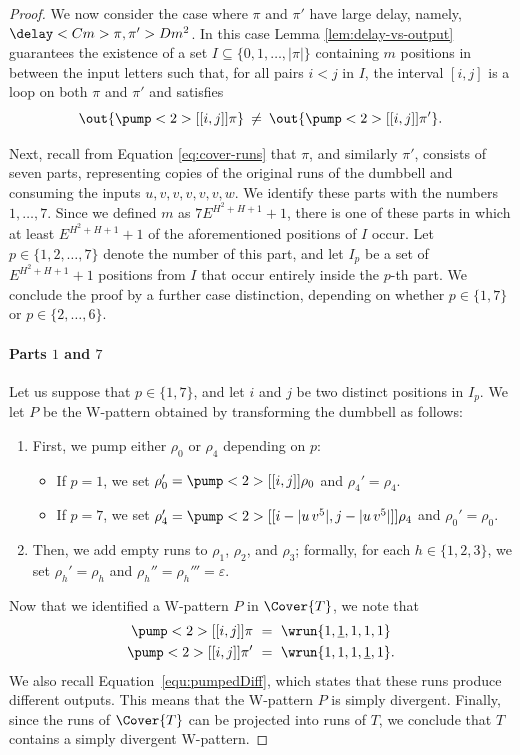 \documentclass{article}
\begin{document}
\begin{proof}
We now consider the case where $\pi$ and $\pi'$
have large delay, namely,
$\delay<C m>{\pi,\pi'} > D m^2$.
In this case Lemma \ref{lem:delay-vs-output} guarantees 
the existence of a set
$I \subseteq \{0, 1, \ldots, |\pi|\}$ containing 
$m$ positions in between the input letters such that,
for all pairs $i < j$ in $I$, the interval $[i,j]$
is a loop on both $\pi$ and $\pi'$ and satisfies
\begin{equation}\label{equ:pumpedDiff}
  \out{\pump<2>[[i,j]]{\pi}} 
  \:\neq\: 
  \out{\pump<2>[[i,j]]{\pi'}}.
\end{equation}

Next, recall from Equation \eqref{eq:cover-runs}
that $\pi$, and similarly $\pi'$, consists of seven parts,
representing copies of the original runs of the dumbbell
and consuming the inputs $u, v, v, v, v, v, w$.
We identify these parts with the numbers $1,\dots,7$.
Since we defined $m$ as $7E^{H^2 + H + 1}+1$,
there is one of these parts
in which at least $E^{H^2 + H + 1}+1$ of the 
aforementioned positions of $I$ occur.
Let $p \in \{1,2,\ldots,7\}$
denote the number of this part,
and let $I_p$ be a set of $E^{H^2 + H + 1}+1$ positions from $I$
that occur entirely inside the $p$-th part.
We conclude the proof by a further case distinction, 
depending on whether $p \in \{1,7\}$ or $p \in \{2,\dots,6\}$.

\paragraph{Parts $1$ and $7$}
Let us suppose that $p \in \{1,7\}$, 
and let $i$ and $j$ be two distinct positions in $I_p$.
We let $P$ be the W-pattern obtained by transforming 
the dumbbell as follows:
\begin{enumerate}
    \item First, we pump either $\rho_0$ or $\rho_4$
          depending on $p$:
    \begin{itemize}
        \item
        If $p = 1$, we set $\rho_0' = \pump<2>[[i,j]]{\rho_0}$
        and $\rho_4' = \rho_4$.
        \item
        If $p = 7$, we set $\rho_4' = \pump<2>[[i-|u\,v^5|,j-|u\,v^5|]]{\rho_4}$
        and $\rho_0' = \rho_0$.
    \end{itemize}
    \item Then, we add empty runs to $\rho_1$, $\rho_2$, and $\rho_3$;
    formally, for each $h \in \{1,2,3\}$, we set
    $\rho_h' = \rho_h$ and $\rho_h'' = \rho_h''' = \varepsilon$.
\end{enumerate}
Now that we identified a W-pattern $P$ in $\Cover{T}$, 
we note that 
\[
\begin{aligned}
  \pump<2>[[i,j]]{\pi}  &~=~ \wrun{1,\underline{1},1,1,1} \\
  \pump<2>[[i,j]]{\pi'} &~=~ \wrun{1,1,1,\underline{1},1}.
\end{aligned}
\]
We also recall Equation~\ref{equ:pumpedDiff}, which states 
that these runs produce different outputs.
This means that the W-pattern $P$ is simply divergent.
Finally, since the runs of $\Cover{T}$ can be projected 
into runs of $T$, we conclude that $T$ contains a 
simply divergent W-pattern.



\end{proof}
\end{document}
